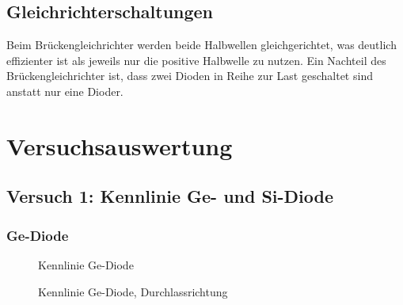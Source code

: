 \documentclass[a4paper]{article}
\begin{document}
\subsection{Gleichrichterschaltungen}
Beim Brückengleichrichter werden beide Halbwellen gleichgerichtet, was deutlich effizienter ist als jeweils nur die positive Halbwelle zu nutzen. Ein Nachteil des Brückengleichrichter ist, dass zwei Dioden in Reihe zur Last geschaltet sind anstatt nur eine Dioder.

\newpage

\section{Versuchsauswertung}

\subsection{Versuch 1: Kennlinie Ge- und Si-Diode}

\subsubsection{Ge-Diode}

\begin{figure}[H]
    \centering
    \caption{Kennlinie Ge-Diode}
    \label{fig:kennlinie-ge}
\end{figure}

\begin{figure}[H]
    \centering
    \caption{Kennlinie Ge-Diode, Durchlassrichtung}
    \label{fig:kennlinie-ge-durchlass}
\end{figure}
\end{document}
